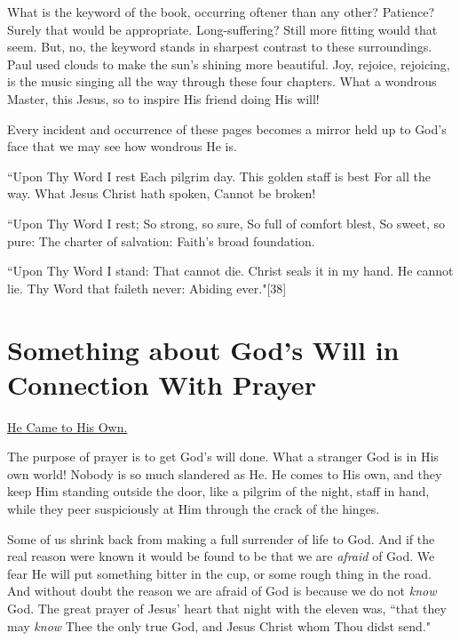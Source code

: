What is the keyword of the book, occurring oftener than any other?
Patience? Surely that would be appropriate. Long-suffering? Still more
fitting would that seem. But, no, the keyword stands in sharpest contrast
to these surroundings. Paul used clouds to make the sun's shining more
beautiful. Joy, rejoice, rejoicing, is the music singing all the way
through these four chapters. What a wondrous Master, this Jesus, so to
inspire His friend doing His will!

Every incident and occurrence of these pages becomes a mirror held up to
God's face that we may see how wondrous He is.

    ``Upon Thy Word I rest
      Each pilgrim day.
    This golden staff is best
      For all the way.
    What Jesus Christ hath spoken,
      Cannot be broken!

    ``Upon Thy Word I rest;
      So strong, so sure,
    So full of comfort blest,
      So sweet, so pure:
    The charter of salvation:
      Faith's broad foundation.

    ``Upon Thy Word I stand:
      That cannot die.
    Christ seals it in my hand.
      He cannot lie.
    Thy Word that faileth never:
      Abiding ever."[38]




\chapter{Something about God's Will in Connection With Prayer}



\underline{He Came to His Own.}


The purpose of prayer is to get God's will done. What a stranger God is in
His own world! Nobody is so much slandered as He. He comes to His own, and
they keep Him standing outside the door, like a pilgrim of the night,
staff in hand, while they peer suspiciously at Him through the crack of
the hinges.

Some of us shrink back from making a full surrender of life to God. And if
the real reason were known it would be found to be that we are \textit{afraid} of
God. We fear He will put something bitter in the cup, or some rough thing
in the road. And without doubt the reason we are afraid of God is because
we do not \textit{know} God. The great prayer of Jesus' heart that night with the
eleven was, ``that they may \textit{know} Thee the only true God, and Jesus
Christ whom Thou didst send."

